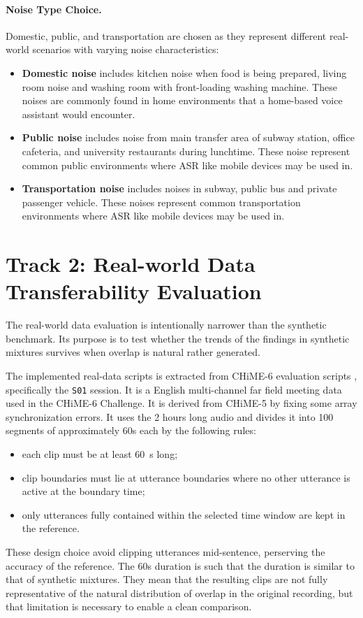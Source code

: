 \paragraph{Noise Type Choice.} Domestic, public, and transportation are chosen as they represent different real-world scenarios with varying noise characteristics:
\begin{itemize}
    \item \textbf{Domestic noise} includes kitchen noise when food is being prepared, living room noise and washing room with front-loading washing machine. These noises are commonly found in home environments that a home-based voice assistant would encounter.
    \item \textbf{Public noise} includes noise from main transfer area of subway station, office cafeteria, and university restaurants during lunchtime. These noise represent common public environments where ASR like mobile devices may be used in.
    \item \textbf{Transportation noise} includes noises in subway, public bus and private passenger vehicle. These noises represent common transportation environments where ASR like mobile devices may be used in.
\end{itemize}

\section{Track 2: Real-world Data Transferability Evaluation}
The real-world data evaluation is intentionally narrower than the synthetic benchmark. Its purpose is to test whether the trends of the findings in synthetic mixtures survives when overlap is natural rather generated.

The implemented real-data scripts is extracted from CHiME-6 evaluation scripts \cite{chime6}, specifically the \texttt{S01} session. It is a  English multi-channel far field meeting data used in the CHiME-6 Challenge. It is derived from CHiME-5 by fixing some array synchronization errors. It uses the 2 hours long audio and divides it into 100 segments of approximately 60s each by the following rules:
\begin{itemize}
    \item each clip must be at least \SI{60}{\second} long;
    \item clip boundaries must lie at utterance boundaries where no other utterance is active at the boundary time;
    \item only utterances fully contained within the selected time window are kept in the reference.
\end{itemize}
These design choice avoid clipping utterances mid-sentence, perserving the accuracy of the reference. The 60s duration is such that the duration is similar to that of synthetic mixtures. They mean that the resulting clips are not fully representative of the natural distribution of overlap in the original recording, but that limitation is necessary to enable a clean comparison.

